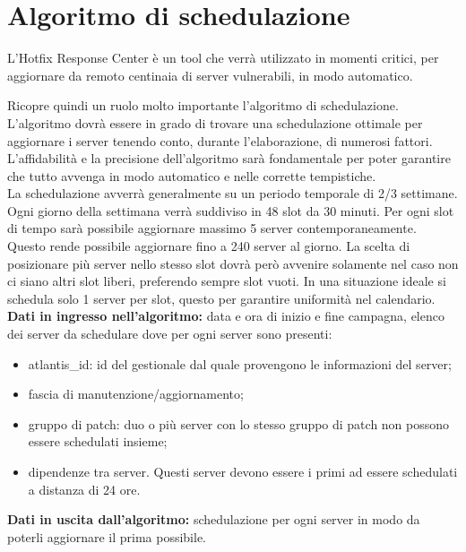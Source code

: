\section{Algoritmo di schedulazione}
L’Hotfix Response Center è un tool che verrà utilizzato in momenti 
critici, per aggiornare da remoto centinaia di server vulnerabili, 
in modo automatico.

Ricopre quindi un ruolo molto importante l’algoritmo di schedulazione. 
L’algoritmo dovrà essere in grado di trovare una schedulazione 
ottimale per aggiornare i server tenendo conto, durante l'elaborazione, 
di numerosi fattori. L’affidabilità e la 
precisione dell’algoritmo sarà fondamentale per poter garantire che 
tutto avvenga in modo automatico e nelle corrette tempistiche.\\

La schedulazione avverrà generalmente su un periodo temporale 
di 2/3 settimane. Ogni giorno della settimana verrà suddiviso in 48 
slot da 30 minuti. Per ogni slot di tempo sarà possibile aggiornare 
massimo 5 server contemporaneamente. Questo rende possibile aggiornare 
fino a 240 server al giorno. La scelta di posizionare più server nello 
stesso slot dovrà però avvenire solamente nel caso non ci siano altri slot 
liberi, preferendo sempre slot vuoti. In una situazione ideale si schedula 
solo 1 server per slot, questo per garantire uniformità nel calendario.\\

\noindent \textbf{Dati in ingresso nell'algoritmo:} data e ora di inizio e fine campagna, elenco dei 
server da schedulare dove per ogni server sono presenti:
\begin{itemize}
\item atlantis\_id: id del gestionale dal quale provengono le informazioni del server;
\item fascia di manutenzione/aggiornamento;
\item gruppo di patch: duo o più server con lo stesso gruppo di patch non possono 
essere schedulati insieme;
\item dipendenze tra server. Questi server devono essere i primi ad essere 
schedulati a distanza di 24 ore.
\end{itemize}

\noindent \textbf{Dati in uscita dall'algoritmo:} schedulazione per ogni server in modo da poterli 
aggiornare il prima possibile.


